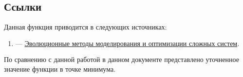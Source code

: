 \subsection {Ссылки}

Данная функция приводится в следующих источниках:

\begin{enumerate}
\item \cite[стр. 27]{book:Semenkin2007} ---  \href{http://files.lib.sfu-kras.ru/ebibl/umkd/22/u_lectures.pdf}{Эволюционные методы моделирования и оптимизации сложных систем}.
\end{enumerate}

По сравнению с данной работой в данном документе представлено уточненное значение функции в точке минимума.
